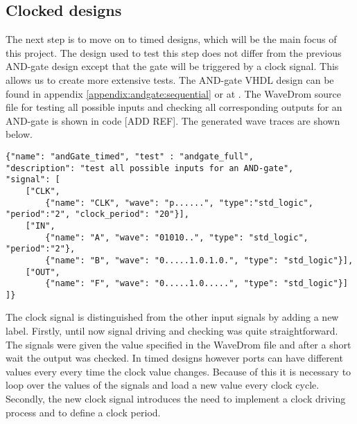 \subsection{Clocked designs}
The next step is to move on to timed designs, which will be the main focus of this project. The design used to test this step does not differ from the previous AND-gate design except that the gate will be triggered by a clock signal. This allows us to create more extensive tests. The AND-gate VHDL design can be found in appendix \ref{appendix:andgate:sequential} or at \cite{examples}.
\npar
The WaveDrom source file for testing all possible inputs and checking all corresponding outputs for an AND-gate is shown in code [ADD REF]. The generated wave traces are shown below.
\begin{lstlisting}[style=json, caption={JSON source file for a full AND-gate test}, label={json:andgate_full}]
{"name": "andGate_timed", "test" : "andgate_full", 
"description": "test all possible inputs for an AND-gate", 
"signal": [
	["CLK",
		{"name": "CLK", "wave": "p......", "type":"std_logic", "period":"2", "clock_period": "20"}],
	["IN",
		{"name": "A", "wave": "01010..", "type": "std_logic", "period":"2"},
		{"name": "B", "wave": "0.....1.0.1.0.", "type": "std_logic"}],
	["OUT",
		{"name": "F", "wave": "0.....1.0.....", "type": "std_logic"}]
]}
\end{lstlisting}\clearpage
{}\noindent
The clock signal is distinguished from the other input signals by adding a new label.
\npar
Firstly, until now signal driving and checking was quite straightforward. The signals were given the value specified in the WaveDrom file and after a short wait the output was checked. In timed designs however ports can have different values every every time the clock value changes. Because of this it is necessary to loop over the values of the signals and load a new value every clock cycle.
\npar
Secondly, the new clock signal introduces the need to implement a clock driving process and to define a clock period. 
